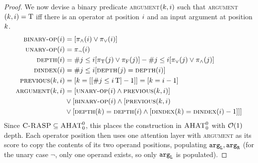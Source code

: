 \documentclass{article}
\begin{document}
\begin{proof}
    We now devise a binary predicate \textsc{argument}$({{ k}},{{ i}})$ such that \textsc{argument}$({{ k}},{{ i}}) = {\mathbin{\mathrm{T}}}$ iff there is an operator at position ${{ i}}$ and an input argument at position ${{ k}}$.
    \begin{subequations}
        \begin{align}
            \text{\textsc{binary-op}}({{ i}}) & = [{\pi}_{\land}({{ i}}) \lor {\pi}_{\lor}({{ i}})] \\
            \text{\textsc{unary-op}}({{ i}}) & = {\pi}_{\neg}({{ i}})\\
            \text{\textsc{depth}}({{ i}}) & = \# {{ j}} \leq {{ i}} [{\pi}_{{\mathbin{\mathrm{T}}}}({{ j}}) \lor {\pi}_{{\mathbin{\mathrm{F}}}}({{ j}})] - \# {{ j}} \leq {{ i}} [{\pi}_{\lor}({{ j}}) \lor {\pi}_{\land}({{ j}})] \\
            \text{\textsc{dindex}}({{ i}}) & = \# {{ j}} \leq {{ i}} [\text{\textsc{depth}}({{ j}}) = \text{\textsc{depth}}({{ i}})] \\
            \text{\textsc{previous}}({{ k}}, {{ i}}) & = [{{ k}} = [[\# {{ j}} \leq {{ i}} \, {\mathbin{\mathrm{T}}}] - 1]] = [{{ k}} = {{ i}} - 1] \\
            \text{\textsc{argument}}({{ k}}, {{ i}}) & = [\text{\textsc{unary-op}}({{ i}}) \land \text{\textsc{previous}}({{ k}}, {{ i}})] \\ & \lor [\text{\textsc{binary-op}}({{ i}}) \land [\text{\textsc{previous}}({{ k}}, {{ i}}) \\ & \lor [\text{\textsc{depth}}({{ k}}) = \text{\textsc{depth}}({{ i}}) \land [\text{\textsc{dindex}}({{ k}}) = \text{\textsc{dindex}}({{ i}})-1]]]
        \end{align}
    \end{subequations}
    Since $\textsc{C-RASP} \subseteq {{\textsc{AHAT}}}^0_0$, this places the construction in ${{\textsc{AHAT}}}^0_0$ with ${{ \mathcal{O}}}(1)$ depth. Each operator position then uses one attention layer with \textsc{argument} as its score to copy the contents of its two operand positions, populating ${\mathtt{arg}_\mathtt{L}}, {\mathtt{arg}_\mathtt{R}}$ (for the unary case $\neg$, only one operand exists, so only ${\mathtt{arg}_\mathtt{L}}$ is populated).
\end{proof}
\end{document}
